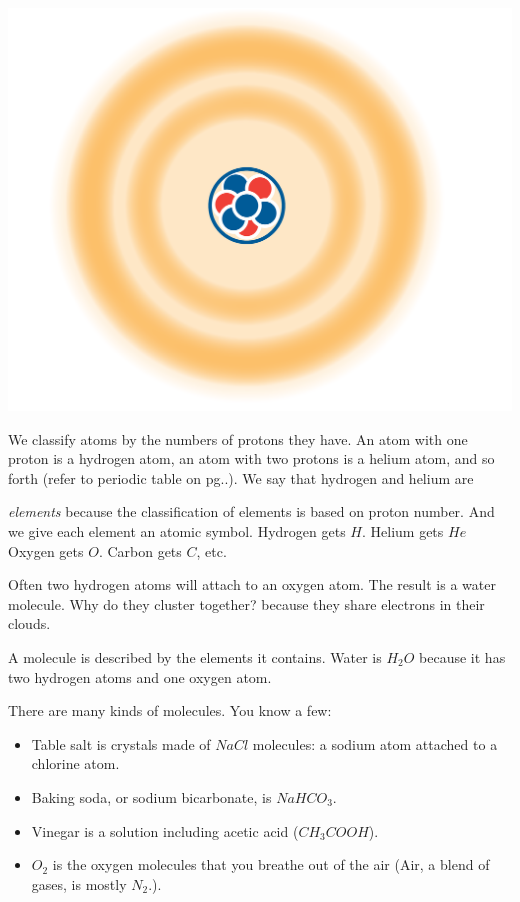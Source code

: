 \includegraphics[width=1\textwidth]{atomCloud.png}


We classify atoms by the numbers of protons they have. An atom with one proton is a
hydrogen atom, an atom with two protons is a helium atom, and so forth (refer to periodic table on pg..). We say that hydrogen and helium are

\textit{elements} because the classification of elements is based on proton number. And we give
each element an atomic symbol. Hydrogen gets $H$. Helium gets $He$ Oxygen gets
$O$. Carbon gets $C$, etc.

Often two hydrogen atoms will attach to an oxygen atom. The result is
a water molecule. Why do they cluster together? because they share 
electrons in their clouds.

A molecule is described by the elements it contains. Water is $H_2O$
because it has two hydrogen atoms and one oxygen atom.

There are many kinds of molecules. You know a few:
\begin{itemize}
\item Table salt is crystals made of $NaCl$ molecules: a sodium atom attached to a chlorine atom.
\item Baking soda, or sodium bicarbonate, is $NaHCO_3$.
\item Vinegar is a solution including acetic acid ($CH_3COOH$).
\item $O_2$ is the oxygen molecules that you breathe out of the air (Air, a blend of gases, is mostly $N_2$.).
\end{itemize}


